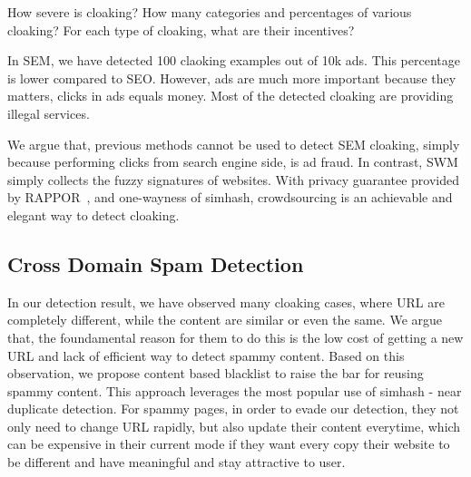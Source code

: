 How severe is cloaking? How many categories and percentages of various cloaking?
For each type of cloaking, what are their incentives?

In SEM, we have detected 100 claoking examples out of 10k ads. This percentage
is lower compared to SEO. However, ads are much more important because they
matters, clicks in ads equals money. Most of the detected cloaking are providing
illegal services.

We argue that, previous methods cannot be used to detect SEM cloaking, simply
because performing clicks from search engine side, is ad fraud. In contrast,
SWM simply collects the fuzzy signatures of websites. With privacy guarantee
provided by RAPPOR~\cite{erlingsson2014rappor}, and one-wayness of simhash,
crowdsourcing is an achievable and elegant way to detect cloaking.

\subsection{Cross Domain Spam Detection}
In our detection result, we have observed many cloaking cases, where URL are
completely different, while the content are similar or even the same.
We argue that, the foundamental reason for them to do this is the low cost of
getting a new URL and lack of efficient way to detect spammy content.
Based on this observation, we propose content based blacklist to raise the bar
for reusing spammy content. This approach leverages the most popular use of
simhash - near duplicate detection. For spammy pages, in order to evade our
detection, they not only need to change URL rapidly, but also update their
content everytime, which can be expensive in their current mode if they want
every copy their website to be different and have meaningful and stay attractive
to user.


